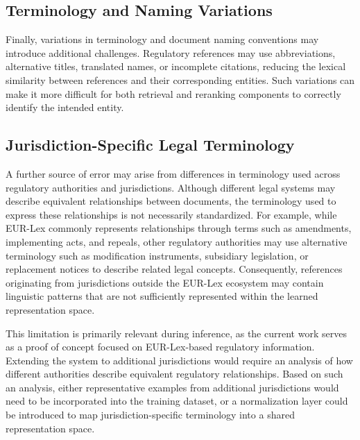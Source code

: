 \subsection{Terminology and Naming Variations}

Finally, variations in terminology and document naming conventions may introduce additional challenges. Regulatory references may use abbreviations, alternative titles, translated names, or incomplete citations, reducing the lexical similarity between references and their corresponding entities. Such variations can make it more difficult for both retrieval and reranking components to correctly identify the intended entity.

\subsection{Jurisdiction-Specific Legal Terminology}

A further source of error may arise from differences in terminology used across regulatory authorities and jurisdictions. Although different legal systems may describe equivalent relationships between documents, the terminology used to express these relationships is not necessarily standardized. For example, while EUR-Lex commonly represents relationships through terms such as amendments, implementing acts, and repeals, other regulatory authorities may use alternative terminology such as modification instruments, subsidiary legislation, or replacement notices to describe related legal concepts. Consequently, references originating from jurisdictions outside the EUR-Lex ecosystem may contain linguistic patterns that are not sufficiently represented within the learned representation space.

This limitation is primarily relevant during inference, as the current work serves as a proof of concept focused on EUR-Lex-based regulatory information. Extending the system to additional jurisdictions would require an analysis of how different authorities describe equivalent regulatory relationships. Based on such an analysis, either representative examples from additional jurisdictions would need to be incorporated into the training dataset, or a normalization layer could be introduced to map jurisdiction-specific terminology into a shared representation space.